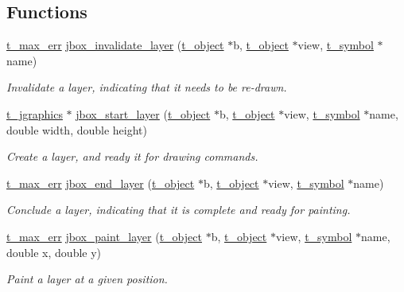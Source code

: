 \subsection*{Functions}
\begin{DoxyCompactItemize}
\item 
\hyperlink{group__datatypes_ga73edaae82b318855cc09fac994918165}{t\_\-max\_\-err} \hyperlink{group__boxlayer_gab9ef903725b25eb3e1ab584a9f29f1a4}{jbox\_\-invalidate\_\-layer} (\hyperlink{structt__object}{t\_\-object} $\ast$b, \hyperlink{structt__object}{t\_\-object} $\ast$view, \hyperlink{structt__symbol}{t\_\-symbol} $\ast$name)
\begin{DoxyCompactList}\small\item\em Invalidate a layer, indicating that it needs to be re-\/drawn. \item\end{DoxyCompactList}\item 
\hyperlink{group__jgraphics_ga4bf27bd7e21a59a427481b909d4656e7}{t\_\-jgraphics} $\ast$ \hyperlink{group__boxlayer_ga9a6684193d5b946f1e61afebf603ad9c}{jbox\_\-start\_\-layer} (\hyperlink{structt__object}{t\_\-object} $\ast$b, \hyperlink{structt__object}{t\_\-object} $\ast$view, \hyperlink{structt__symbol}{t\_\-symbol} $\ast$name, double width, double height)
\begin{DoxyCompactList}\small\item\em Create a layer, and ready it for drawing commands. \item\end{DoxyCompactList}\item 
\hyperlink{group__datatypes_ga73edaae82b318855cc09fac994918165}{t\_\-max\_\-err} \hyperlink{group__boxlayer_gae8607b453997030d7bc252b40d066884}{jbox\_\-end\_\-layer} (\hyperlink{structt__object}{t\_\-object} $\ast$b, \hyperlink{structt__object}{t\_\-object} $\ast$view, \hyperlink{structt__symbol}{t\_\-symbol} $\ast$name)
\begin{DoxyCompactList}\small\item\em Conclude a layer, indicating that it is complete and ready for painting. \item\end{DoxyCompactList}\item 
\hyperlink{group__datatypes_ga73edaae82b318855cc09fac994918165}{t\_\-max\_\-err} \hyperlink{group__boxlayer_ga87b03b3d160e3a798c7f799773e68750}{jbox\_\-paint\_\-layer} (\hyperlink{structt__object}{t\_\-object} $\ast$b, \hyperlink{structt__object}{t\_\-object} $\ast$view, \hyperlink{structt__symbol}{t\_\-symbol} $\ast$name, double x, double y)
\begin{DoxyCompactList}\small\item\em Paint a layer at a given position. \item\end{DoxyCompactList}\end{DoxyCompactItemize}



